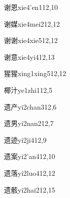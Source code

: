 \begin{verbete}{谢恩}{xie4'en1}{12,10}
\end{verbete}

\begin{verbete}{谢媒}{xie4mei2}{12,12}
\end{verbete}

\begin{verbete}{谢谢}{xie4xie5}{12,12}
\end{verbete}

\begin{verbete}{谢意}{xie4yi4}{12,13}
\end{verbete}

\begin{verbete}{猩猩}{xing1xing5}{12,12}
\end{verbete}

\begin{verbete}{椰汁}{ye1zhi1}{12,5}
\end{verbete}

\begin{verbete}{遗产}{yi2chan3}{12,6}
\end{verbete}

\begin{verbete}{遗男}{yi2nan2}{12,7}
\end{verbete}

\begin{verbete}{遗迹}{yi2ji4}{12,9}
\end{verbete}

\begin{verbete}{遗案}{yi2'an4}{12,10}
\end{verbete}

\begin{verbete}{遗落}{yi2luo4}{12,12}
\end{verbete}

\begin{verbete}{遗骸}{yi2hai2}{12,15}
\end{verbete}

